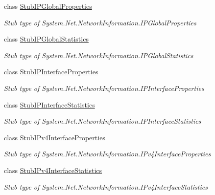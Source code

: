 \begin{DoxyCompactItemize}
class \hyperlink{class_system_1_1_net_1_1_network_information_1_1_fakes_1_1_stub_i_p_global_properties}{Stub\-I\-P\-Global\-Properties}
\begin{DoxyCompactList}\small\item\em Stub type of System.\-Net.\-Network\-Information.\-I\-P\-Global\-Properties\end{DoxyCompactList}\item 
class \hyperlink{class_system_1_1_net_1_1_network_information_1_1_fakes_1_1_stub_i_p_global_statistics}{Stub\-I\-P\-Global\-Statistics}
\begin{DoxyCompactList}\small\item\em Stub type of System.\-Net.\-Network\-Information.\-I\-P\-Global\-Statistics\end{DoxyCompactList}\item 
class \hyperlink{class_system_1_1_net_1_1_network_information_1_1_fakes_1_1_stub_i_p_interface_properties}{Stub\-I\-P\-Interface\-Properties}
\begin{DoxyCompactList}\small\item\em Stub type of System.\-Net.\-Network\-Information.\-I\-P\-Interface\-Properties\end{DoxyCompactList}\item 
class \hyperlink{class_system_1_1_net_1_1_network_information_1_1_fakes_1_1_stub_i_p_interface_statistics}{Stub\-I\-P\-Interface\-Statistics}
\begin{DoxyCompactList}\small\item\em Stub type of System.\-Net.\-Network\-Information.\-I\-P\-Interface\-Statistics\end{DoxyCompactList}\item 
class \hyperlink{class_system_1_1_net_1_1_network_information_1_1_fakes_1_1_stub_i_pv4_interface_properties}{Stub\-I\-Pv4\-Interface\-Properties}
\begin{DoxyCompactList}\small\item\em Stub type of System.\-Net.\-Network\-Information.\-I\-Pv4\-Interface\-Properties\end{DoxyCompactList}\item 
class \hyperlink{class_system_1_1_net_1_1_network_information_1_1_fakes_1_1_stub_i_pv4_interface_statistics}{Stub\-I\-Pv4\-Interface\-Statistics}
\begin{DoxyCompactList}\small\item\em Stub type of System.\-Net.\-Network\-Information.\-I\-Pv4\-Interface\-Statistics\end{DoxyCompactList}\item 

\end{DoxyCompactItemize}
